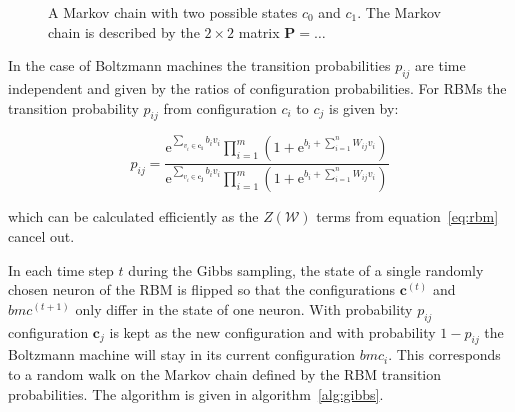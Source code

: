 \begin{figure}[H]
    \label{fig:markov}
    \centering
    \caption{A Markov chain with two possible states $c_0$ and $c_1$. The Markov chain is 
described by the $2 \times 2$ matrix $\bm{P}=\dots$}
\end{figure}

In the case of Boltzmann machines the transition probabilities $p_{ij}$ are time independent and 
given by the ratios of configuration probabilities. For RBMs the transition probability $p_{ij}$ 
from configuration $c_i$ to $c_j$ is given by:

\begin{equation}
    p_{ij} = \frac{\mathrm{e}^{\sum_{v_i \in \bm{c_i}}b_iv_i}\prod_{i=1}^m(1+\mathrm{e}^{b_i + \sum_{i=1}^nW_{ij}v_i})}{\mathrm{e}^{\sum_{v_i \in \bm{c_j}}b_iv_i}\prod_{i=1}^m(1+\mathrm{e}^{b_i + \sum_{i=1}^nW_{ij}v_i})}
\end{equation}

which can be calculated efficiently as the $Z(\mathcal{W})$ terms from equation~\ref{eq:rbm} cancel out.

In each time step $t$ during the Gibbs sampling, the state of a single randomly chosen neuron of the RBM is flipped
so that the configurations $\bm{c}^{(t)}$ and $bm{c}^{(t+1)}$ only differ in the state of one neuron. With 
probability $p_{ij}$ configuration $\bm{c}_j$ is kept as the new configuration and with probability
$1-p_{ij}$ the Boltzmann machine will stay in its current configuration $bm{c}_i$. This corresponds to a random walk on the Markov chain defined by the RBM transition probabilities. The algorithm is given in 
algorithm~\ref{alg:gibbs}.

